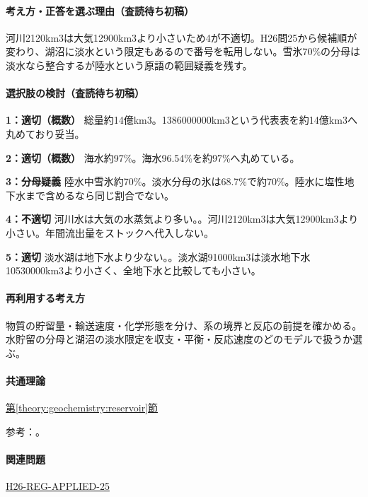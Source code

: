 \paragraph{考え方・正答を選ぶ理由（査読待ち初稿）} 河川2120km3は大気12900km3より小さいため4が不適切。H26問25から候補順が変わり、湖沼に淡水という限定もあるので番号を転用しない。雪氷70\%の分母は淡水なら整合するが陸水という原語の範囲疑義を残す。

\paragraph{選択肢の検討（査読待ち初稿）}\mbox{}\par

\noindent\textbf{1：適切（概数）} 総量約14億km3。1386000000km3という代表表を約14億km3へ丸めており妥当。\par

\noindent\textbf{2：適切（概数）} 海水約97\%。海水96.54\%を約97\%へ丸めている。\par

\noindent\textbf{3：分母疑義} 陸水中雪氷約70\%。淡水分母の氷は68.7\%で約70\%。陸水に塩性地下水まで含めるなら同じ割合でない。\par

\noindent\textbf{4：不適切} 河川水は大気の水蒸気より多い。。河川2120km3は大気12900km3より小さい。年間流出量をストックへ代入しない。\par

\noindent\textbf{5：適切} 淡水湖は地下水より少ない。。淡水湖91000km3は淡水地下水10530000km3より小さく、全地下水と比較しても小さい。\par

\paragraph{再利用する考え方} 物質の貯留量・輸送速度・化学形態を分け、系の境界と反応の前提を確かめる。水貯留の分母と湖沼の淡水限定を収支・平衡・反応速度のどのモデルで扱うか選ぶ。

\paragraph{共通理論} \hyperref[theory:geochemistry:reservoir]{第\ref*{theory:geochemistry:reservoir}節}

\par 参考：\cite{gc_water}。

\paragraph{関連問題} \hyperref[q:h26-reg-applied-25]{H26-REG-APPLIED-25}

